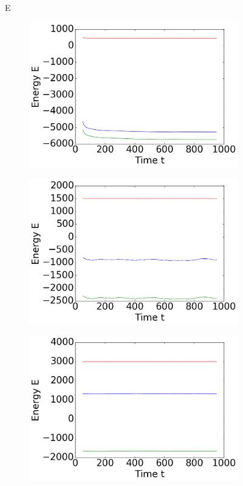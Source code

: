 \begin{figure}[ht]
E
\hfill
\begin{subfigure}{0.3\textwidth}
\includegraphics[width=\textwidth]{../dat/avEnergies_T0d3_M100.png}
\end{subfigure}
\hfill
\begin{subfigure}{0.3\textwidth}
\includegraphics[width=\textwidth]{../dat/avEnergies_T1d0_M100.png}
\end{subfigure}
\hfill
\begin{subfigure}{0.3\textwidth}
\includegraphics[width=\textwidth]{../dat/avEnergies_T2d0_M100.png}
\end{subfigure}


\end{figure}
